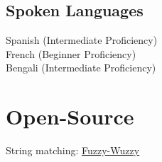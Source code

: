 \documentclass[]{deedy-resume-openfont}
\begin{document}
\begin{minipage}[t]{0.31\textwidth}
\subsection{Spoken Languages}
Spanish (Intermediate Proficiency) \\
French (Beginner Proficiency)\\
Bengali (Intermediate Proficiency)
\\[1\baselineskip]

\section{Open-Source}
\textbullet{} String matching: \underline{\href{https://github.com/seatgeek/fuzzywuzzy}{Fuzzy-Wuzzy}} 

%
%

\end{minipage} 
\hfill
\end{document}
